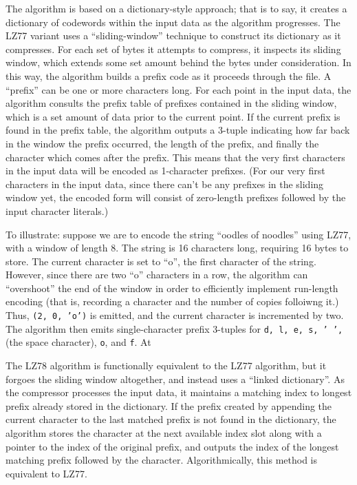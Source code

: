 \documentclass[12pt]{article}
\begin{document}
The algorithm is based on a dictionary-style approach; that is to say,
it creates a dictionary of codewords within the input data as the
algorithm progresses. The LZ77 variant uses a ``sliding-window''
technique to construct its dictionary as it compresses. \cite{lz77}
For each set of bytes it attempts to compress, it inspects its sliding
window, which extends some set amount behind the bytes under
consideration. In this way, the algorithm builds a prefix code as it
proceeds through the file. A ``prefix'' can be one or more characters
long. For each point in the input data, the algorithm consults the
prefix table of prefixes contained in the sliding window, which is a
set amount of data prior to the current point. If the current prefix
is found in the prefix table, the algorithm outputs a 3-tuple
indicating how far back in the window the prefix occurred, the length
of the prefix, and finally the character which comes after the
prefix. This means that the very first characters in the input data
will be encoded as 1-character prefixes. (For our very first
characters in the input data, since there can't be any prefixes in the
sliding window yet, the encoded form will consist of zero-length
prefixes followed by the input character literals.)

To illustrate: suppose we are to encode the string ``oodles of
noodles'' using LZ77, with a window of length 8. The string is 16
characters long, requiring 16 bytes to store. The current character is
set to ``o'', the first character of the string. However, since there
are two ``o'' characters in a row, the algorithm can ``overshoot'' the
end of the window in order to efficiently implement run-length
encoding (that is, recording a character and the number of copies
folloiwng it.) Thus, \texttt{(2, 0, 'o')} is emitted, and the current
character is incremented by two. The algorithm then emits
single-character prefix 3-tuples for \texttt{d, l, e, s, ' ',} (the
space character), \texttt{o}, and \texttt{f}. At

The LZ78 algorithm is functionally equivalent to the LZ77 algorithm,
but it forgoes the sliding window altogether, and instead uses a
``linked dictionary''. \cite{lz78} As the compressor processes the
input data, it maintains a matching index to longest prefix already
stored in the dictionary. If the prefix created by appending the
current character to the last matched prefix is not found in the
dictionary, the algorithm stores the character at the next available
index slot along with a pointer to the index of the original prefix,
and outputs the index of the longest matching prefix followed by the
character. Algorithmically, this method is equivalent to LZ77.
\end{document}
